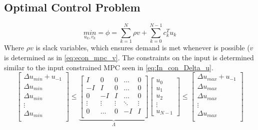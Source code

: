 \subsection{Optimal Control Problem}
\begin{equation}
    \underset{u_k,v_k}{min}=\phi=\sum_{k=1}^N\rho v+\sum_{k=0}^{N-1}c_k^Tu_k
\end{equation}
Where $\rho v$ is slack variables, which ensures demand is met whenever is possible ($v$ is determined as in \cref{eq:econ_mpc_v}. The constraints on the input is determined similar to the input constrained MPC seen in \cref{eq:In_con_Delta_u}. 
\begin{equation}
    \begin{bmatrix}
        \Delta u_{min}+u_{-1}\\
        \Delta u_{min}\\
        \Delta u_{min}\\
        \vdots\\
        \Delta u_{min}\\
    \end{bmatrix} \leq
    \underbrace{
    \begin{bmatrix}
        I & 0 & 0 & \dots & 0\\
        -I & I & 0 & \dots & 0\\
        0 & -I & I & \dots & 0\\
        \vdots & \vdots & \vdots & \ddots & \vdots \\
        0 & \dots & 0 & -I & I\\
    \end{bmatrix}}_\Lambda
    \begin{bmatrix}
        u_0\\ u_1\\ u_2\\ \vdots\\ u_{N-1}
    \end{bmatrix}\leq
    \begin{bmatrix}
        \Delta u_{max}+u_{-1}\\
        \Delta u_{max}\\
        \Delta u_{max}\\
        \vdots\\
        \Delta u_{max}\\
    \end{bmatrix}
\end{equation}
